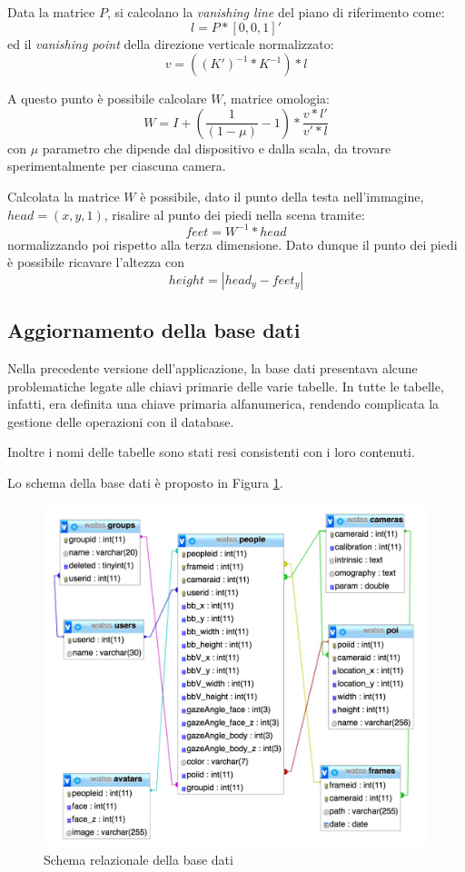 Data la matrice $P$, si calcolano la \emph{vanishing line} del piano di riferimento come:
\begin{equation}
l = P * [0, 0, 1]'
\end{equation}
ed il \emph{vanishing point} della direzione verticale normalizzato:
\begin{equation}
v = ((K')^{-1} * K^{-1}) * l
\end{equation}

A questo punto è possibile calcolare $W$, matrice omologia:
\begin{equation}
W = I + (\frac{1}{(1 - \mu)} - 1) * \frac{v * l'}{v' * l}
\end{equation}
con $\mu$ parametro che dipende dal dispositivo e dalla scala, da trovare sperimentalmente per ciascuna camera.

Calcolata la matrice $W$ è possibile, dato il punto della testa nell'immagine, $head = (x, y, 1)$, risalire al punto dei piedi nella scena tramite:
\begin{equation}
feet = W^{-1} * head
\end{equation}
normalizzando poi rispetto alla terza dimensione\cite{del2009scale}. Dato dunque il punto dei piedi è possibile ricavare l'altezza con
\begin{equation}
height = |head_y - feet_y|
\end{equation}

\subsection{Aggiornamento della base dati}

Nella precedente versione dell'applicazione, la base dati presentava alcune problematiche legate alle chiavi primarie delle varie tabelle. In tutte le tabelle, infatti, era definita una chiave primaria alfanumerica, rendendo complicata la gestione delle operazioni con il database.

Inoltre i nomi delle tabelle sono stati resi consistenti con i loro contenuti.

Lo schema della base dati è proposto in Figura \ref{fig:er}.

\begin{figure}[h]
\centering
\includegraphics[width=.9\linewidth]{images/erdiagram.jpg}
  \caption{Schema relazionale della base dati}
  \label{fig:er}
\end{figure}